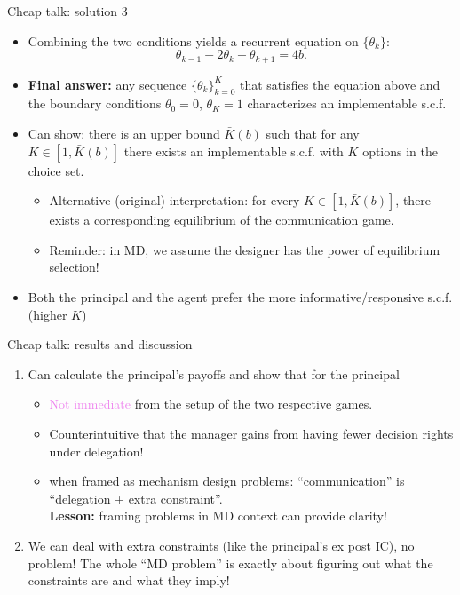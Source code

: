 \documentclass[english,10pt
,aspectratio=169
]{beamer}
\begin{document}
\begin{frame}{Cheap talk: solution 3}
	\begin{itemize}
		\item Combining the two conditions yields a recurrent equation on $\{\theta_k\}$: $$\theta_{k-1}-2\theta_k + \theta_{k+1} = 4b.$$
		
		\item \textbf{Final answer:} any sequence $\{\theta_k\}_{k=0}^K$ that satisfies the equation above and the boundary conditions $\theta_0 = 0$, $\theta_K = 1$ characterizes an implementable s.c.f.
		
		\item Can show: there is an upper bound $\bar{K}(b)$ such that for any $K \in [1, \bar{K}(b)]$ there exists an implementable s.c.f. with $K$ options in the choice set. 
		\begin{itemize}
			\item Alternative (original) interpretation: for every $K \in [1, \bar{K}(b)]$, there exists a corresponding equilibrium of the communication game. 
			\item Reminder: in MD, we assume the designer has the power of equilibrium selection!
		\end{itemize}
		
		\item Both the principal and the agent prefer the more informative/responsive s.c.f. (higher $K$)
	\end{itemize}
\end{frame}


\begin{frame}{Cheap talk: results and discussion}
	\begin{enumerate}
		\item Can calculate the principal's payoffs and show that  for the principal
		\begin{itemize}
			\item \textcolor{violet}{Not immediate} from the setup of the two respective games.
			\item \alert{Counterintuitive} that the manager gains from having fewer decision rights under delegation!
			\item {} when framed as mechanism design problems: ``communication'' is ``delegation + extra constraint''. \\
			\textbf{Lesson:} framing problems in MD context can provide clarity!
		\end{itemize}
		
		\item We can deal with extra constraints (like the principal's ex post IC), no problem! The whole ``MD problem'' is exactly about figuring out what the constraints are and what they imply!
	\end{enumerate}
\end{frame}
\end{document}
